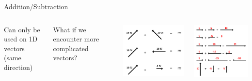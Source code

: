 \documentclass{beamer}
\begin{document}
\begin{frame}{Addition/Subtraction}
	\begin{columns}
		Can only be used on 1D vectors \\ (same direction)\\~\\
		\uncover<2-> {What if we encounter more complicated vectors?\\
		\begin{center}
			\includegraphics[scale=0.4]{compvec.png}
		\end{center}}
		\includegraphics[scale=0.5]{vectoradd.png}
	\end{columns}
	
\end{frame}
\end{document}
